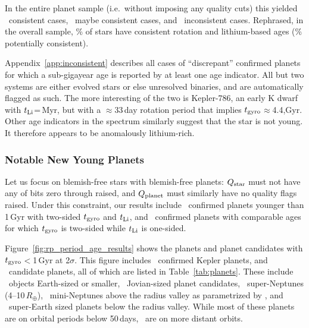 \documentclass[11pt,twocolumn,tighten,linenumbers,trackchanges]{aastex63}
\begin{document}
In the entire planet sample (i.e.~without imposing any quality cuts)
this yielded \allagesyesconsistent\ consistent cases,
\allagesmaybeconsistent\ maybe consistent cases, and
\allagesnoconsistent\ inconsistent cases.  Rephrased, in the overall
sample, \fracconsistentallages\% of stars have consistent rotation and
lithium-based ages (\fracpotentiallyconsistentallages\% potentially
consistent).

Appendix~\ref{app:inconsistent} describes all cases of ``discrepant''
confirmed planets for which a sub-gigayear age is reported by at least
one age indicator.  All but two systems are either evolved stars or
else unresolved binaries, and are automatically flagged as such.  The
more interesting of the two is Kepler-786, an early K dwarf with
$t_{\rm Li}$=\kepseveneightsix\,Myr, but with a $\approx$33\,day
rotation period that implies $t_{\rm
gyro}$$\approx$4.4,Gyr.  Other age indicators in the
spectrum similarly suggest that the star is not young.  It 
therefore appears to be anomalously lithium-rich. 



\subsubsection{Notable New Young Planets}
\label{subsec:notables}

Let us focus on blemish-free stars with blemish-free planets: $Q_{\rm
star}$ must not have any of bits zero through  raised, and $Q_{\rm
planet}$ must similarly have no quality flags raised.  Under this
constraint, our results include \ltonegyrhighqconfirmedtwosided\
confirmed planets younger than 1\,Gyr with two-sided $t_{\rm gyro}$
and $t_{\rm Li}$, and \ltonegyrhighqconfirmedonesided\ confirmed
planets with comparable ages for which $t_{\rm gyro}$ is two-sided
while $t_{\rm Li}$ is one-sided.

Figure~\ref{fig:rp_period_age_results} shows the planets and planet
candidates with $t_{\rm gyro}$$<$1\,Gyr at 2$\sigma$.  This figure
includes \nconfirmedplyounggyrotwosigmanograzingnoruwe\ confirmed
Kepler planets, and \ncandidateplyounggyrotwosigmanograzingnoruwe\
candidate planets, all of which are listed in Table~\ref{tab:planets}.
These include \nearthshighq\ objects Earth-sized or smaller,
\njupitershighq\ Jovian-sized planet candidates, \nsubsaturnshighq\
super-Neptunes (4--10\,$R_\oplus$), \nminineptuneshighq\ mini-Neptunes
above the radius valley as parametrized by
\citealt{2018MNRAS.479.4786V}, and \nsuperearthshighq\ super-Earth
sized planets below the radius valley.  While most of these planets
are on orbital periods below 50\,days, \nlongperiodhighq\ are on more
distant orbits.
\end{document}
